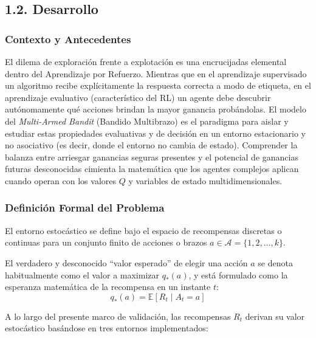 \subsection{1.2. Desarrollo}\label{desarrollo}

\subsubsection{Contexto y Antecedentes}\label{contexto-y-antecedentes}

El dilema de exploración frente a explotación es una encrucijadas
elemental dentro del Aprendizaje por Refuerzo. Mientras que en el
aprendizaje supervisado un algoritmo recibe explícitamente la respuesta
correcta a modo de etiqueta, en el aprendizaje evaluativo
(característico del RL) un agente debe descubrir autónomamente qué
acciones brindan la mayor ganancia probándolas. El modelo del
\emph{Multi-Armed Bandit} (Bandido Multibrazo) es el paradigma para
aislar y estudiar estas propiedades evaluativas y de decisión en un
entorno estacionario y no asociativo (es decir, donde el entorno no
cambia de estado). Comprender la balanza entre arriesgar ganancias
seguras presentes y el potencial de ganancias futuras desconocidas
cimienta la matemática que los agentes complejos aplican cuando operan
con los valores \(Q\) y variables de estado multidimensionales.

\subsubsection{Definición Formal del
Problema}\label{definiciuxf3n-formal-del-problema}

El entorno estocástico se define bajo el espacio de recompensas
discretas o continuas para un conjunto finito de acciones o brazos
\(a \in \mathcal{A} = \{1, 2, \dots, k\}\).

El verdadero y desconocido ``valor esperado'' de elegir una acción \(a\)
se denota habitualmente como el valor a maximizar \(q_*(a)\), y está
formulado como la esperanza matemática de la recompensa en un instante
\(t\): \[ q_*(a) = \mathbb{E}[R_t \mid A_t = a] \]

A lo largo del presente marco de validación, las recompensas \(R_t\)
derivan su valor estocástico basándose en tres entornos implementados:

